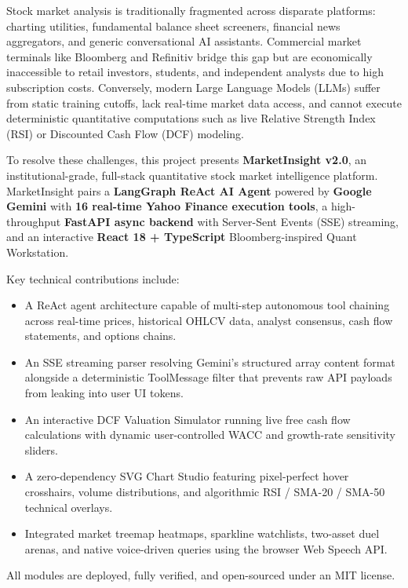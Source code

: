 \documentclass[12pt,a4paper]{report}
\begin{document}
\begin{mdframed}[linecolor=cbitred,linewidth=1.5pt,leftmargin=0,rightmargin=0,
  innerleftmargin=12pt,innerrightmargin=12pt,innertopmargin=12pt,innerbottommargin=12pt]
Stock market analysis is traditionally fragmented across disparate platforms: charting utilities, fundamental balance sheet screeners, financial news aggregators, and generic conversational AI assistants. Commercial market terminals like Bloomberg and Refinitiv bridge this gap but are economically inaccessible to retail investors, students, and independent analysts due to high subscription costs. Conversely, modern Large Language Models (LLMs) suffer from static training cutoffs, lack real-time market data access, and cannot execute deterministic quantitative computations such as live Relative Strength Index (RSI) or Discounted Cash Flow (DCF) modeling.

To resolve these challenges, this project presents \textbf{MarketInsight v2.0}, an institutional-grade, full-stack quantitative stock market intelligence platform. MarketInsight pairs a \textbf{LangGraph ReAct AI Agent} powered by \textbf{Google Gemini} with \textbf{16 real-time Yahoo Finance execution tools}, a high-throughput \textbf{FastAPI async backend} with Server-Sent Events (SSE) streaming, and an interactive \textbf{React 18 + TypeScript} Bloomberg-inspired Quant Workstation. 

Key technical contributions include:
\begin{itemize}[leftmargin=*]
  \item A ReAct agent architecture capable of multi-step autonomous tool chaining across real-time prices, historical OHLCV data, analyst consensus, cash flow statements, and options chains.
  \item An SSE streaming parser resolving Gemini's structured array content format alongside a deterministic ToolMessage filter that prevents raw API payloads from leaking into user UI tokens.
  \item An interactive DCF Valuation Simulator running live free cash flow calculations with dynamic user-controlled WACC and growth-rate sensitivity sliders.
  \item A zero-dependency SVG Chart Studio featuring pixel-perfect hover crosshairs, volume distributions, and algorithmic RSI / SMA-20 / SMA-50 technical overlays.
  \item Integrated market treemap heatmaps, sparkline watchlists, two-asset duel arenas, and native voice-driven queries using the browser Web Speech API.
\end{itemize}
All modules are deployed, fully verified, and open-sourced under an MIT license.
\end{mdframed}
\end{document}
